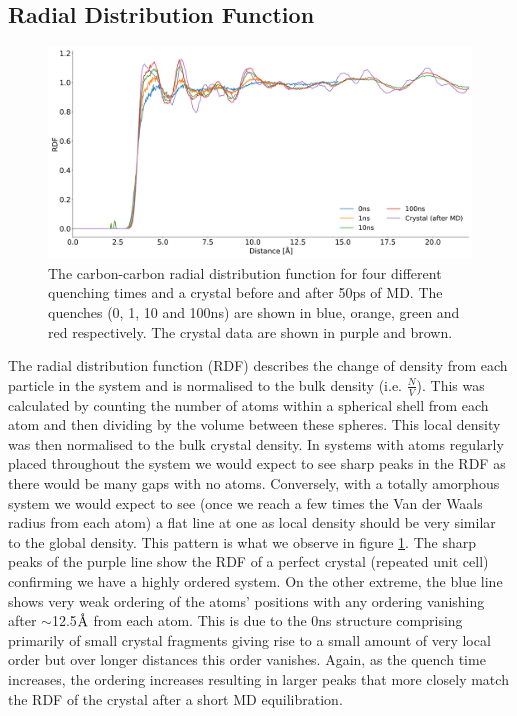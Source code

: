 \subsection{Radial Distribution Function}
\begin{figure}[H]
	\centering
	\includegraphics[width=\textwidth]{../img/DifferentQuenchTimes/RDF.png}
	\caption{\label{fig:RDF}The carbon-carbon radial distribution function for four different quenching times and a crystal before and after 50ps of MD. The quenches (0, 1, 10 and 100ns) are shown in blue, orange, green and red respectively. The crystal data are shown in purple and brown.}
\end{figure}
\noindent The radial distribution function (RDF) describes the change of density from each particle in the system and is normalised to the bulk density (i.e. $\frac{N}{V}$). This was calculated by counting the number of atoms within a spherical shell from each atom and then dividing by the volume between these spheres. This local density was then normalised to the bulk crystal density. In systems with atoms regularly placed throughout the system we would expect to see sharp peaks in the RDF as there would be many gaps with no atoms. Conversely, with a totally amorphous system we would expect to see (once we reach a few times the Van der Waals radius from each atom) a flat line at one as local density should be very similar to the global density. This pattern is what we observe in figure \ref{fig:RDF}. The sharp peaks of the purple line show the RDF of a perfect crystal (repeated unit cell) confirming we have a highly ordered system. On the other extreme, the blue line shows very weak ordering of the atoms' positions with any ordering vanishing after $\sim$12.5$\text{\normalfont\AA}$ from each atom. This is due to the 0ns structure comprising primarily of small crystal fragments giving rise to a small amount of very local order but over longer distances this order vanishes. Again, as the quench time increases, the ordering increases resulting in larger peaks that more closely match the RDF of the crystal after a short MD equilibration.


